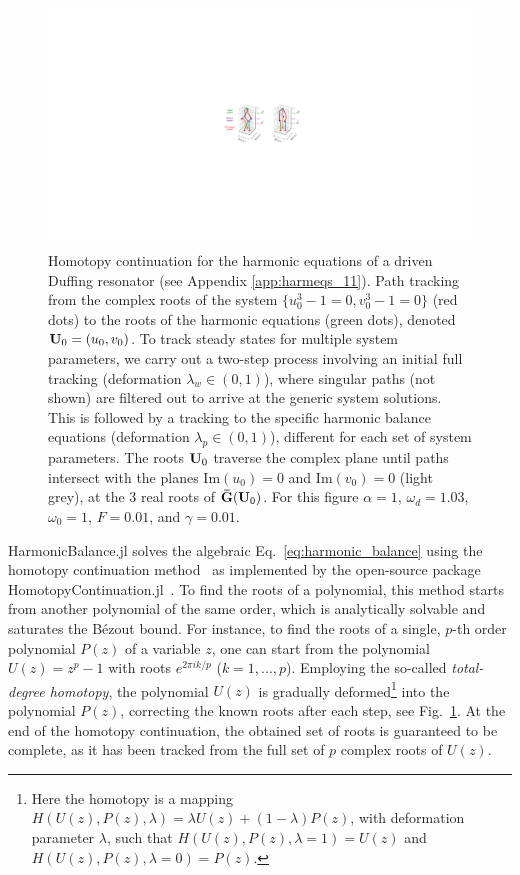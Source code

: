 \begin{figure}[t]
	\centering
	\includegraphics[width=\textwidth]{figures/hb/hb_paths.pdf}
	\caption{Homotopy continuation for the harmonic equations of a driven Duffing resonator (see Appendix \ref{app:harmeqs_11}). Path tracking from the complex roots of the system $\{u_0^3-1=0,v_0^3-1=0\}$ (red dots) to the roots of the harmonic equations (green dots), denoted $\vb{U}_0=(u_0,v_0)$.  To track steady states for multiple system parameters, we carry out a two-step process involving an initial full tracking (deformation $\lambda_w\in(0,1)$), where singular paths (not shown) are filtered out to arrive at the generic system solutions. This is followed by a tracking to the specific harmonic balance equations (deformation $\lambda_p\in(0,1)$), different for each set of system parameters.  The roots $\vb{U}_0$ traverse the complex plane until paths intersect with the planes $\mathrm{Im}(u_0)=0$ and $\mathrm{Im}(v_0)=0$ (light grey), at the 3 real roots of $\vb{\bar{G}}(\vb{U}_0)$. For this figure $\alpha=1$, $\omega_d=1.03$, $\omega_0=1$, $F=0.01$, and $\gamma=0.01$.}
	\label{fig:path_track}
\end{figure} 

HarmonicBalance.jl solves the algebraic Eq.~\eqref{eq:harmonic_balance} using the homotopy continuation method~\cite{Bates_2013, Verschelde_1999} as implemented by the open-source package HomotopyContinuation.jl~\cite{Breiding_2018}. To find the roots of a polynomial, this method starts from another polynomial of the same order, which is analytically solvable and saturates the Bézout bound. For instance, to find the roots of a single, $p$-th order polynomial $P(z)$ of a variable $z$, one can start from the polynomial $U(z)=z^p - 1$ with roots $e^{2\pi i k /p}$ ($k = 1,..., p$). Employing the so-called \textit{total-degree homotopy}, the polynomial $U(z)$ is gradually deformed\footnote{Here the homotopy is a mapping $H(U(z),P(z),\lambda)=\lambda U(z)+(1-\lambda)P(z)$, with deformation parameter $\lambda$, such that $H(U(z),P(z),\lambda=1)=U(z)$ and $H(U(z),P(z),\lambda=0)=P(z)$.} into the polynomial $P(z)$, correcting the known roots after each step, see Fig.~\ref{fig:path_track}. At the end of the homotopy continuation, the obtained set of roots is guaranteed to be complete, as it has been tracked from the full set of $p$ complex roots of $U(z)$.

